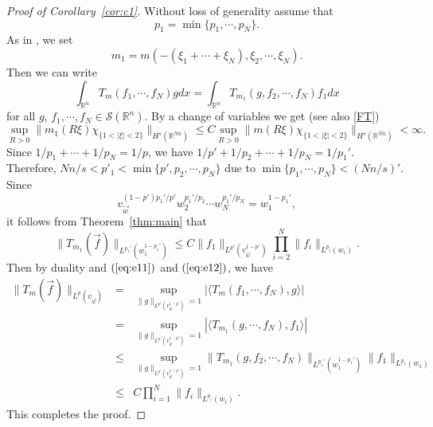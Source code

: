 \documentclass[11pt,oneside,onecolumn]{amsart}
\numberwithin{equation}{section}
\begin{document}
\begin{proof}[Proof of Corollary~\ref{cor:c1}]
Without loss of generality  assume that
\[
  p_1=\min\{p_1,\cdots, p_N\}.
\] 
  As in \cite{FT}, we set
\[
  m_1=m(-(\xi_1+\cdots+\xi_N),\xi_2,\cdots,\xi_N).
\]
Then we can write
\begin{equation}\label{eq:e11}
\int_{{\mathbb{R}}^n}T_{m}(f_1,\cdots,f_N)gdx=\int_{{\mathbb{R}}^n} T_{m_1}(g,f_2,\cdots,f_N)f_1 dx
\end{equation}
for all $g$, $f_1,\cdots,f_N\in\mathscr{S}({\mathbb{R}}^n)$.
By a change of variables we get (see also \ref{FT})
\[
  \sup_{R>0}\|m_1(R\xi)\chi^{}_{\{1<|\xi|<2\}}\|_{H^s({\mathbb{R}}^{Nn})}\le
  C\sup_{R>0}\|m(R\xi)\chi^{}_{\{1<|\xi|<2\}}\|_{H^s({\mathbb{R}}^{Nn})}<\infty.
\]
Since $1/{p_1}+\cdots+1/{p_N}=1/p$, we have $1/{p'}+1/{p_2}+\cdots+1/{p_N}=1/{p_1'}$. Therefore,
$Nn/s<p'_1<\min\{p', p_2, \cdots, p_N\}$ due to $\min\{p_1,\cdots, p_N\}<(Nn/s)'$. Since
\[
  v_{\vec{w}}^{(1-p')p_1'/{p'}}w_2^{p_1'/{p_2}}\cdots w_N^{p_1'/{p_N}}=w_1^{1-p_1'},
\]
it follows from Theorem~\ref{thm:main} that
\begin{equation}\label{eq:e12}
\|T_{m_1}(\vec{f})\|_{L^{p_1'}(w_1^{1-p_1'})}\le C \|f_1\|_{L^{p'}(v_{\vec{w}}^{1-p'})}\prod_{i=2}^N \|f_i\|_{L^{p_i}(w_i)}.
\end{equation}
Then by duality and $(\ref{eq:e11})$ and $(\ref{eq:e12})$, we have
\begin{eqnarray*}
\|T_m(\vec{f})\|_{L^p(v^{}_{\vec{w}})}&=&
         \sup_{\|g\|_{L^{p'}(v_{\vec{w}}^{1-p'})}=1}|\langle T_{m}(f_1,\cdots,f_N),g\rangle|\\
&=&
         \sup_{\|g\|_{L^{p'}(v_{\vec{w}}^{1-p'})}=1}|\langle T_{m_1}(g,\cdots,f_N),f_1\rangle|\\
&\le&
         \sup_{\|g\|_{L^{p'}(v_{\vec{w}}^{1-p'})}=1}\|T_{m_1}(g,f_2,\cdots,f_N)\|_{L^{p_1'}(w_1^{1-p_1'})}
         \|f_1\|_{L^{p_1}(w_1)}\\
&\le&    C \prod_{i=1}^N \|f_i\|_{L^{p_i}(w_i)}.
\end{eqnarray*}
This completes the proof.
\end{proof}
\end{document}
